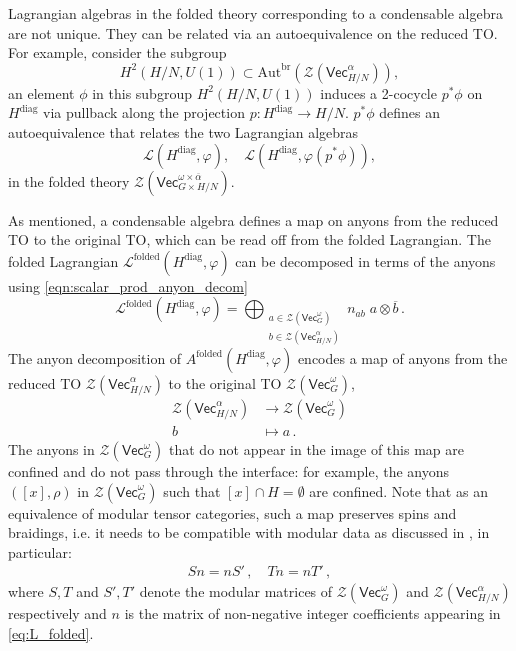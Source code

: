 \documentclass[aps,twocolumn,prx,floatfix,preprintnumbers, nofootinbib,10pt]{revtex4-2}
\numberwithin{equation}{section}
\theoremstyle{definition}
\newcommand{\be}{\begin{equation}}
\newcommand{\ee}{\end{equation}}
\newcommand{\ba}{\begin{aligned}}
\newcommand{\ea}{\end{aligned}}
\newcommand{\nn}{\nonumber}
\newcommand{\cL}{\mathcal{L}}
\newcommand{\cZ}{\mathcal{Z}}
\renewcommand{\Vec}{\mathsf{Vec}}
\newcommand{\eps}{\epsilon}
\newcommand{\vp}{\varphi}
\renewcommand{\ol}{\overline}
\renewcommand{\ol}{\overline}
\newcommand{\diag}{\text{diag}}
\newcommand{\folded}{\text{folded}}
\begin{document}
Lagrangian algebras in the folded theory corresponding to a condensable algebra are not unique. They can be related via an autoequivalence on the reduced TO. For example, consider the subgroup 
\be
    H^2(H/N, U(1)) \subset \text{Aut}^{\text{br}}(\cZ(\Vec_{H/N}^\alpha)),
\ee
an element $\phi$ in this subgroup $H^2(H/N, U(1))$ induces a 2-cocycle $p^*\phi$ on $H^{\diag}$ via pullback along the projection $p:H^{\diag} \rightarrow H/N$. $p^*\phi$ defines an autoequivalence that relates the two Lagrangian algebras 
\be
    \cL(H^{\diag}, \varphi), \quad \cL(H^{\diag}, \varphi (p^*\phi)),
\ee
in the folded theory $\cZ(\Vec_{G\times H/N}^{\omega\times \overline{\alpha}})$.



\vspace{2mm}
 As mentioned, a condensable algebra defines a map on anyons from the reduced TO to the original TO, which can be read off from the folded Lagrangian. The folded Lagrangian $\cL^\folded(H^\diag,\vp)$ can be decomposed in terms of the anyons using \eqref{eqn:scalar_prod_anyon_decom}
\be \label{eq:L_folded}
\cL^{\folded} (H^\diag, \vp) = \bigoplus_{\substack{a \in \cZ(\Vec_G^{\omega})\\ b \in \cZ(\Vec_{H/N}^{\alpha})}} n_{ab} \;{a} \otimes \ol{b} \,.
\ee
The anyon decomposition of $A^\folded(H^\diag,\vp)$ encodes a map of anyons from the reduced TO $\cZ(\Vec_{H/N}^{\alpha})$ to the original TO $\cZ(\Vec_G^{\omega})$, 
\begin{align}
    \cZ(\Vec_{H/N}^{\alpha}) & \rightarrow \cZ(\Vec_G^{\omega})\nn\\
    b & \mapsto a \,.
\end{align}
The anyons in $\cZ(\Vec_G^\omega)$ that do not appear in the image of this map are confined and do not pass through the interface: for example, the anyons $([x],\rho)$ in $\cZ(\Vec_G^\omega)$ such that $[x]\cap H = \emptyset$ are confined.
Note that as an equivalence of modular tensor categories, such a map preserves spins and braidings, i.e. it needs to be compatible with modular data as discussed in \cite{Chatterjee:2022tyg,Ng:2023wsc}, in particular:
\be\ba
    Sn=nS'\,,\quad Tn=nT'\,,
\ea\ee
where $S,T$ and $S',T'$ denote the modular matrices of $\cZ(\Vec_G^\omega)$ and $\cZ(\Vec_{H/N}^{\alpha})$ respectively and $n$ is the matrix of non-negative integer coefficients appearing in \eqref{eq:L_folded}.
\end{document}

